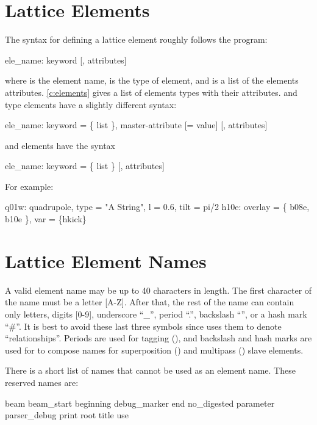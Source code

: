 \section{Lattice Elements}

The syntax for defining a lattice element roughly follows the
\mad\cite{b:maduser} program:
\begin{example}
  ele_name: keyword [, attributes]
\end{example}
where  is the element name,  is the type of
element, and  is a list of the elements
attributes. \cref{c:elements} gives a list of elements types with
their attributes.
 and  type elements have a slightly different syntax:
\begin{example}
  ele_name: keyword = \{ list \}, master-attribute [= value] [, attributes]
\end{example}
and  elements have the syntax
\begin{example}
  ele_name: keyword = \{ list \} [, attributes]
\end{example}  
For example:
\begin{example}
  q01w: quadrupole, type = "A String", l = 0.6, tilt = pi/2
  h10e: overlay = \{ b08e, b10e \}, var = \{hkick\}
\end{example}

\section{Lattice Element Names}
\label{s:ele.names}

A valid element name may be up to 40 characters in length. The first
character of the name must be a letter [A-Z]. After that, the rest of
the name can contain only letters, digits [0-9], underscore ``_'',
period ``.'', backslash ``\B'', or a hash mark ``\#''. It is best to
avoid these last three symbols since \bmad uses them to denote
``relationships''.  Periods are used for tagging (), and
backslash and hash marks are used for to compose names for
superposition () and multipass ()
slave elements.

There is a short list of names that cannot be used as an element name. 
These reserved names are:
\begin{example}
  beam
  beam_start
  beginning
  debug_marker
  end
  no_digested
  parameter
  parser_debug
  print
  root
  title
  use
\end{example}

